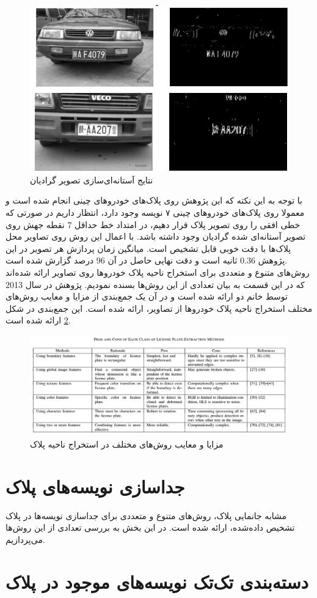 \documentclass[12pt,a4paper]{article}
\begin{document}
\begin{figure}[h]
\centering
\includegraphics[scale=0.4]{Imgs/grad1.png}
\caption{نتایج آستانه‌ای‌سازی تصویر گرادیان \cite{xu2005new}}
\label{fig:grad1}
\end{figure}

با توجه به این‌ نکته که این پژوهش روی پلاک‌های خودروهای چینی انجام شده است و معمولا روی پلاک‌های خودروهای چینی ۷ نویسه وجود دارد، انتظار داریم در صورتی که خطی افقی را روی تصویر پلاک قرار دهیم، در امتداد خط حداقل  7 نقطه جهش روی تصویر آستانه‌ای شده گرادیان وجود داشته باشد. با اعمال این روش روی تصاویر محل پلاک‌ها با دقت خوبی قابل تشخیص است. میانگین زمان پردازش هر تصویر در این پژوهش 0.36 ثانیه است و دقت نهایی حاصل در آن 96 درصد گزارش شده است.
\\
روش‌های متنوع و متعددی برای استخراج ناحیه پلاک خودروها روی تصاویر ارائه شده‌اند که در این قسمت به بیان تعدادی از این روش‌ها بسنده نمودیم. پژوهش \cite{du2013automatic}  در سال 2013 توسط خانم دو ارائه شده است و در آن یک جمع‌بندی از مزایا و معایب روش‌های مختلف استخراج ناحیه پلاک خودروها از تصاویر، ارائه شده است. این جمع‌بندی در شکل \ref{fig:sumtbl1} ارائه شده است.

\begin{figure}[h]
\centering
\includegraphics[scale=0.4]{Imgs/sumtbl1.png}
\caption{مزایا و معایب روش‌های مختلف در استخراج ناحیه پلاک \cite{du2013automatic}}
\label{fig:sumtbl1}
\end{figure}


\section{جداسازی نویسه‌های پلاک}
مشابه جانمایی پلاک، روش‌های متنوع و متعددی برای جداسازی نویسه‌ها در پلاک تشخیص‌ داده‌شده، ارائه شده است. در این بخش به بررسی تعدادی از این روش‌ها می‌پردازیم.

\section{دسته‌بندی تک‌تک نویسه‌های موجود در پلاک}




\end{document}
